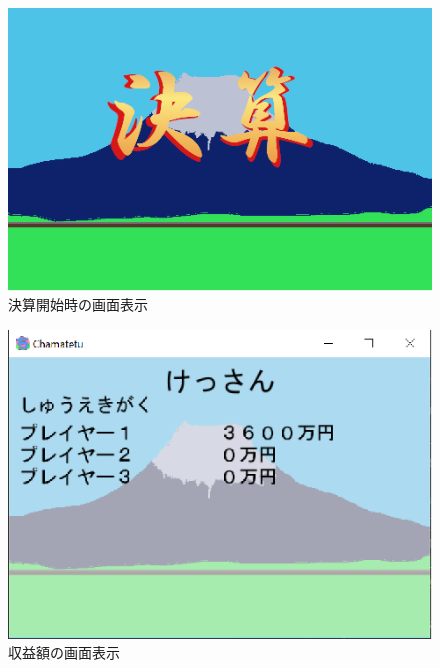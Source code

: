\documentclass[a4j]{jarticle}
\begin{document}
    \begin{figure}[H]
        \centering
        \includegraphics[scale=1.8]{sp1.png}
        \caption{決算開始時の画面表示}
         \label{hujisan}
        \end{figure}

    \begin{figure}[H]
        \centering
        \includegraphics[scale=1.3]{shueki.eps}
        \caption{収益額の画面表示}
         \label{shueki}
        \end{figure}
\end{document}
